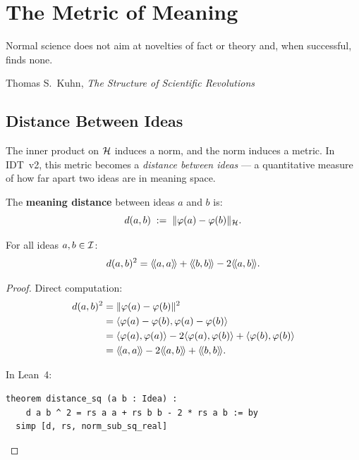 \chapter{The Metric of Meaning}
\label{ch:metric}

\epigraph{Normal science does not aim at novelties of fact or theory
and, when successful, finds none.}{Thomas S.\ Kuhn,
\textit{The Structure of Scientific Revolutions}}

\section{Distance Between Ideas}

The inner product on $\mathcal{H}$ induces a norm, and the norm induces a metric.
In IDT~v2, this metric becomes a \emph{distance between ideas} --- a
quantitative measure of how far apart two ideas are in meaning space.

\begin{definition}
\label{def:meaning-distance}
The \textbf{meaning distance} between ideas $a$ and $b$ is:
\[
  d(a, b) \;:=\; \lVert \varphi(a) - \varphi(b) \rVert_{\mathcal{H}}.
\]
\end{definition}

\begin{theorem}
\label{thm:distance-formula}
For all ideas $a, b \in \mathcal{I}$:
\[
  d(a, b)^2 = \langle\!\langle a, a \rangle\!\rangle + \langle\!\langle b, b \rangle\!\rangle - 2\langle\!\langle a, b \rangle\!\rangle.
\]
\end{theorem}

\begin{proof}
Direct computation:
\begin{align*}
  d(a, b)^2
  &= \lVert \varphi(a) - \varphi(b) \rVert^2 \\
  &= \langle \varphi(a) - \varphi(b), \varphi(a) - \varphi(b) \rangle \\
  &= \langle \varphi(a), \varphi(a) \rangle - 2\langle \varphi(a), \varphi(b) \rangle
     + \langle \varphi(b), \varphi(b) \rangle \\
  &= \langle\!\langle a, a \rangle\!\rangle - 2\langle\!\langle a, b \rangle\!\rangle + \langle\!\langle b, b \rangle\!\rangle.
\end{align*}

In Lean~4:
\begin{lstlisting}
theorem distance_sq (a b : Idea) :
    d a b ^ 2 = rs a a + rs b b - 2 * rs a b := by
  simp [d, rs, norm_sub_sq_real]
\end{lstlisting}
\end{proof}

